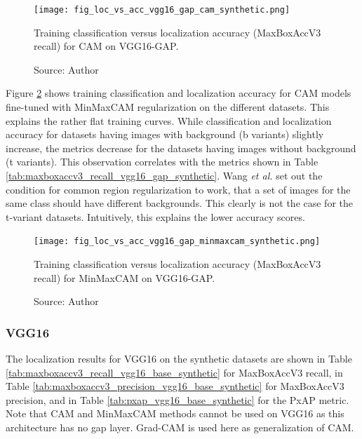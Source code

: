 \begin{figure}[ht]
    \begin{center}       
    \texttt{[image: fig\_loc\_vs\_acc\_vgg16\_gap\_cam\_synthetic.png]}
    \caption[Training classification versus localization accuracy for CAM on VGG16-GAP]{Training classification versus localization accuracy (MaxBoxAccV3 recall) for CAM on VGG16-GAP.}
    \caption*{Source: Author}
    \label{fig:loc_vs_acc_vgg16_gap_cam_synthetic}
    \end{center}
\end{figure}

Figure \ref{fig:loc_vs_acc_vgg16_gap_minmaxcam_synthetic} shows training classification and localization accuracy for CAM models fine-tuned with MinMaxCAM regularization on the different datasets. This explains the rather flat training curves. While classification and localization accuracy for datasets having images with background (b variants) slightly increase, the metrics decrease for the datasets having images without background (t variants). This observation correlates with the metrics shown in Table \ref{tab:maxboxaccv3_recall_vgg16_gap_synthetic}. Wang \textit{et al.} \cite{wang2021minmaxcam} set out the condition for common region regularization to work, that a set of images for the same class should have different backgrounds. This clearly is not the case for the t-variant datasets. Intuitively, this explains the lower accuracy scores.

\begin{figure}[ht]
    \begin{center}       
    \texttt{[image: fig\_loc\_vs\_acc\_vgg16\_gap\_minmaxcam\_synthetic.png]}
    \caption[Training classification versus localization accuracy for MinMaxCAM on VGG16-GAP]{Training classification versus localization accuracy (MaxBoxAccV3 recall) for MinMaxCAM on VGG16-GAP.}
    \caption*{Source: Author}
    \label{fig:loc_vs_acc_vgg16_gap_minmaxcam_synthetic}
    \end{center}
\end{figure}

\subsubsection{VGG16}
The localization results for VGG16 on the synthetic datasets are shown in Table \ref{tab:maxboxaccv3_recall_vgg16_base_synthetic} for MaxBoxAccV3 recall, in Table \ref{tab:maxboxaccv3_precision_vgg16_base_synthetic} for MaxBoxAccV3 precision, and in Table \ref{tab:pxap_vgg16_base_synthetic} for the PxAP metric. Note that CAM and MinMaxCAM methods cannot be used on VGG16 as this architecture has no \acrshort{gap} layer. Grad-CAM is used here as generalization of CAM.


